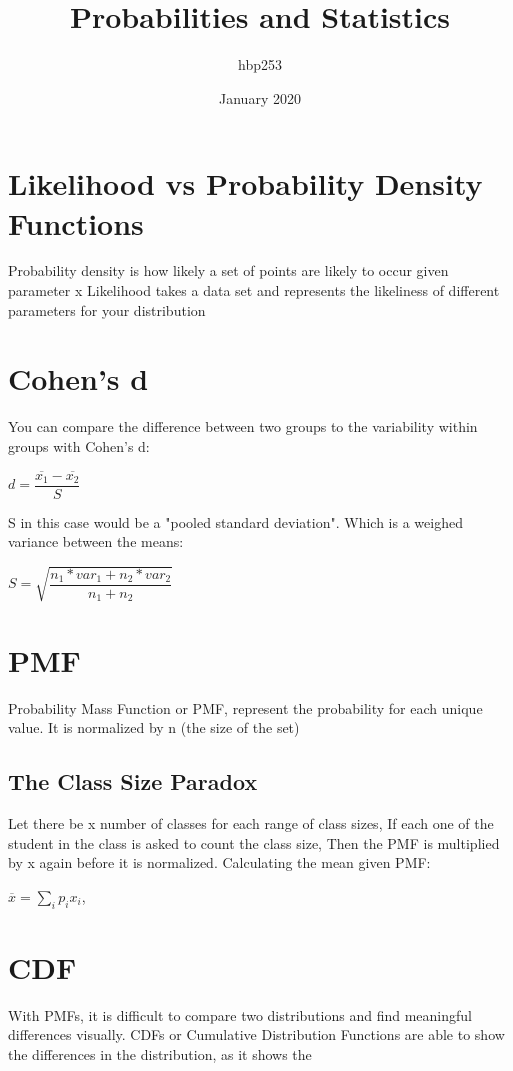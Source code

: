 \documentclass{article}
\title{Probabilities and Statistics}
\author{hbp253}
\date{January 2020}
\begin{document}
\maketitle

\section{Likelihood vs Probability Density Functions}
    Probability density is how likely a set of points are likely to occur given parameter x
    \newline
    Likelihood takes a data set and represents the likeliness of different parameters for your distribution

\section{Cohen's d}
    You can compare the difference between two groups to the variability within groups with Cohen's d:
    \newline
    \begin{center} 
    $d = \dfrac{\overline{x_1} - \overline{x_2}}{S}$
    \end{center}

    S in this case would be a "pooled standard deviation". Which is a weighed variance between the means:
    \begin{center}
    $S = \sqrt{\dfrac{n_1 * var_1 + n_2 * var_2}{n_1 + n_2}}$
    \end{center}

\section{PMF}
Probability Mass Function or PMF, represent the probability for each unique value. It is normalized by n (the size of the set)
\subsection{The Class Size Paradox}
    Let there be x number of classes for each range of class sizes,\newline
    If each one of the student in the class is asked to count the class size,\newline
    Then the PMF is multiplied by x again before it is normalized.\newline
    Calculating the mean given PMF:
    \begin{center}
    $ \overline{x} = \sum_{i}{} p_i x_i $,
    \end{center}

\section{CDF}
    With PMFs, it is difficult to compare two distributions and find meaningful differences visually.\newline
    CDFs or Cumulative Distribution Functions are able to show the differences in the distribution, \newline
    as it shows the 
\end{document}

